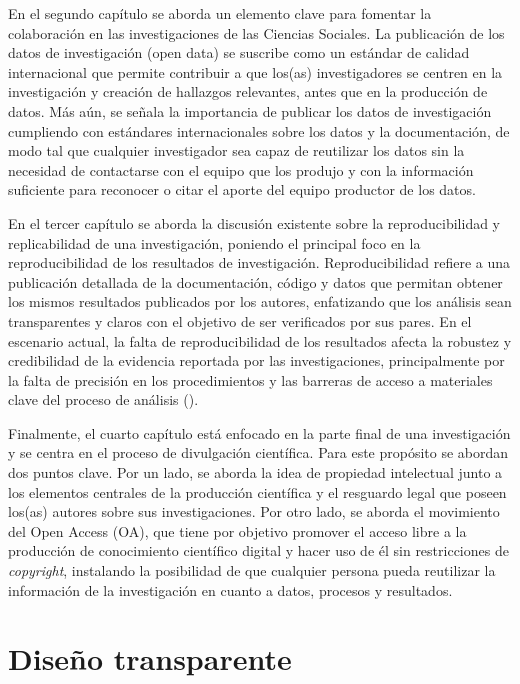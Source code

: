 \documentclass[
  spanish,
  a4paper,
  oneside]{scrbook}
\begin{document}
En el segundo capítulo se aborda un elemento clave para fomentar la
colaboración en las investigaciones de las Ciencias Sociales. La
publicación de los datos de investigación (open data) se suscribe como
un estándar de calidad internacional que permite contribuir a que
los(as) investigadores se centren en la investigación y creación de
hallazgos relevantes, antes que en la producción de datos. Más aún, se
señala la importancia de publicar los datos de investigación cumpliendo
con estándares internacionales sobre los datos y la documentación, de
modo tal que cualquier investigador sea capaz de reutilizar los datos
sin la necesidad de contactarse con el equipo que los produjo y con la
información suficiente para reconocer o citar el aporte del equipo
productor de los datos.

En el tercer capítulo se aborda la discusión existente sobre la
reproducibilidad y replicabilidad de una investigación, poniendo el
principal foco en la reproducibilidad de los resultados de
investigación. Reproducibilidad refiere a una publicación detallada de
la documentación, código y datos que permitan obtener los mismos
resultados publicados por los autores, enfatizando que los análisis sean
transparentes y claros con el objetivo de ser verificados por sus pares.
En el escenario actual, la falta de reproducibilidad de los resultados
afecta la robustez y credibilidad de la evidencia reportada por las
investigaciones, principalmente por la falta de precisión en los
procedimientos y las barreras de acceso a materiales clave del proceso
de análisis ().

Finalmente, el cuarto capítulo está enfocado en la parte final de una
investigación y se centra en el proceso de divulgación científica. Para
este propósito se abordan dos puntos clave. Por un lado, se aborda la
idea de propiedad intelectual junto a los elementos centrales de la
producción científica y el resguardo legal que poseen los(as) autores
sobre sus investigaciones. Por otro lado, se aborda el movimiento del
Open Access (OA), que tiene por objetivo promover el acceso libre a la
producción de conocimiento científico digital y hacer uso de él sin
restricciones de \emph{copyright}, instalando la posibilidad de que
cualquier persona pueda reutilizar la información de la investigación en
cuanto a datos, procesos y resultados.

\part{Diseño transparente}
\end{document}
